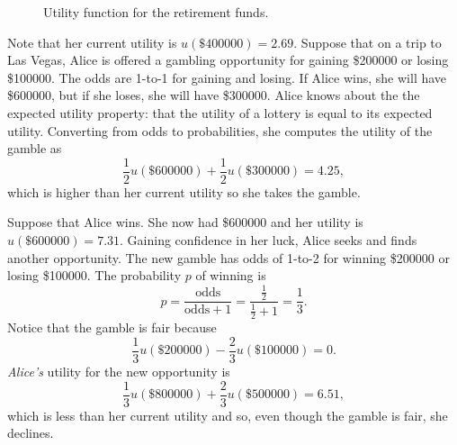 \begin{figure}
\caption{Utility function for the retirement funds.}
\label{fig:retirement}
\end{figure}

Note that her current utility is
$u(\$\num{400000})=2.69$.  Suppose that on a trip to Las Vegas, Alice
is offered a gambling opportunity for gaining \$\num{200000} or losing
\$\num{100000}. The odds are 1-to-1 for gaining and losing. If Alice wins,
she will have \$\num{600000}, but if she loses, she will have
\$\num{300000}. Alice knows about the the expected utility property:
that the utility of a lottery is equal to its expected
utility. Converting from odds to probabilities, she computes the
utility of the gamble as
\[
\frac{1}{2}u(\$\num{600000}) + \frac{1}{2}u(\$\num{300000}) = 4.25,
\]
which is higher than her current utility so she takes the gamble.

Suppose that Alice wins. She now had \$\num{600000} and her utility is
$u(\$\num{600000}) = 7.31$.  
Gaining confidence in her luck, Alice seeks and finds another
opportunity. The new gamble has odds of 1-to-2 for winning
\$\num{200000} or losing \$\num{100000}. 
The probability $p$ of winning is
\[
p = \frac{\text{odds}}{\text{odds}+1} = 
\frac{\frac{1}{2}}{\frac{1}{2} + 1} = \frac{1}{3}.
\]
Notice that the gamble is fair because
\[
\frac{1}{3}u(\$\num{200000}) - \frac{2}{3}u(\$\num{100000}) = 0.
\]
\emph{Alice's} utility for the new opportunity is
\[
\frac{1}{3}u(\$\num{800000}) + \frac{2}{3}u(\$\num{500000}) = 6.51,
\]
which is less than her current utility and so, even though
the gamble is fair, she declines.

